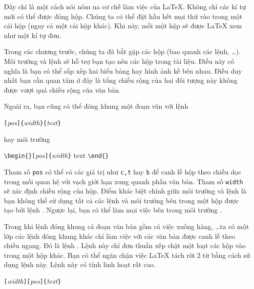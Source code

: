Đây chỉ là một cách nói nôm na cơ chế làm việc của \LaTeX{}. Không
chỉ các kí tự mới có thể được đóng hộp. Chúng ta có thể đặt hầu
hết mọi thứ vào trong một cái hộp (ngay cả một cái hộp khác). Khi
này, mỗi một hộp sẽ được \LaTeX{} xem như một kí tự đơn.

Trong các chương trước, chúng ta đã bắt gặp các hộp (bao quanh các
lệnh, \ldots). Môi trường  và lệnh
 sẽ hỗ trợ bạn tạo nên các hộp trong tài liệu.
Điều này có nghĩa là bạn có thể sắp xếp hai biểu bảng hay hình ảnh
kế bên nhau. Điều duy nhất bạn cần quan tâm ở đây là tổng chiều
rộng của hai đối tượng này không được vượt quá chiều rộng của văn
bản.

Ngoài ra, bạn cũng có thể đóng khung một đoạn văn với lệnh

\begin{lscommand}
\verb|[|\emph{pos}\verb|]{|\emph{width}\verb|}{|\emph{text}\verb|}|
\end{lscommand}

\noindent hay môi trường

\begin{lscommand}
\verb|\begin{|\verb|}[|\emph{pos}\verb|]{|\emph{width}\verb|}| text
\verb|\end{|\verb|}|
\end{lscommand}

\noindent Tham số \texttt{pos} có thể có các giá trị như
\texttt{c,t} hay \texttt{b} để canh lề hộp theo chiều dọc trong
mối quan hệ với vạch giới hạn xung quanh phần văn bản. Tham số
\texttt{width} sẽ xác định chiều rộng của hộp. Điểm khác biệt
chính giữa môi trường  và lệnh  là bạn
không thể sử dụng tất cả các lệnh và môi trường bên trong một hộp
được tạo bởi lệnh . Ngược lại, bạn có thể làm mọi việc
bên trong môi trường .

Trong khi lệnh  đóng khung cả đoạn văn bản gồm cả việc
xuống hàng, \ldots ta có một lớp các lệnh đóng khung khác chỉ làm
việc với các văn bản được canh lề theo chiều ngang. Đó là lệnh
. Lệnh này chỉ đơn thuần xếp chặt một loạt các hộp vào
trong một hộp khác. Bạn có thể ngăn chặn việc \LaTeX{} tách rời 2
từ bằng cách sử dụng lệnh này. Lệnh này có tính linh hoạt rất cao.

\begin{lscommand}
\verb|[|\emph{width}\verb|][|\emph{pos}\verb|]{|\emph{text}\verb|}|
\end{lscommand}

